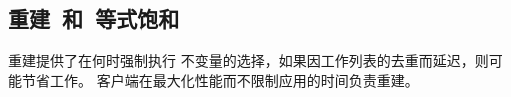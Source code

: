 \subsection{重建~和~等式饱和}
\label{sec:rebuilding-eqsat}

重建提供了在何时强制执行 \egraph 不变量的选择，如果因工作列表的去重而延迟，则可能节省工作。
客户端在最大化性能而不限制应用的时间负责重建。

